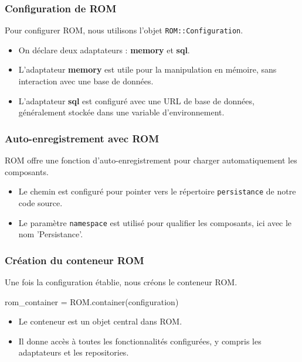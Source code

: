 \begin{frame}
  \frametitle{Configuration de ROM}

  Pour configurer ROM, nous utilisons l'objet \texttt{ROM::Configuration}.

  \begin{itemize}
    \item On déclare deux adaptateurs : \textbf{memory} et \textbf{sql}.
    \item L'adaptateur \textbf{memory} est utile pour la manipulation en mémoire, sans interaction avec une base de données.
    \item L'adaptateur \textbf{sql} est configuré avec une URL de base de données, généralement stockée dans une variable d'environnement.
  \end{itemize}

\end{frame}

\begin{frame}
  \frametitle{Auto-enregistrement avec ROM}

  ROM offre une fonction d'auto-enregistrement pour charger automatiquement les composants.

  \begin{itemize}
    \item Le chemin est configuré pour pointer vers le répertoire \texttt{persistance} de notre code source.
    \item Le paramètre \texttt{namespace} est utilisé pour qualifier les composants, ici avec le nom 'Persistance'.
  \end{itemize}

\end{frame}


\begin{frame}
  \frametitle{Création du conteneur ROM}

  Une fois la configuration établie, nous créons le conteneur ROM.

  \begin{semiverbatim}
  rom\_container = ROM.container(configuration)
  \end{semiverbatim}

  \begin{itemize}
    \item Le conteneur est un objet central dans ROM.
    \item Il donne accès à toutes les fonctionnalités configurées, y compris les adaptateurs et les repositories.
  \end{itemize}

\end{frame}

